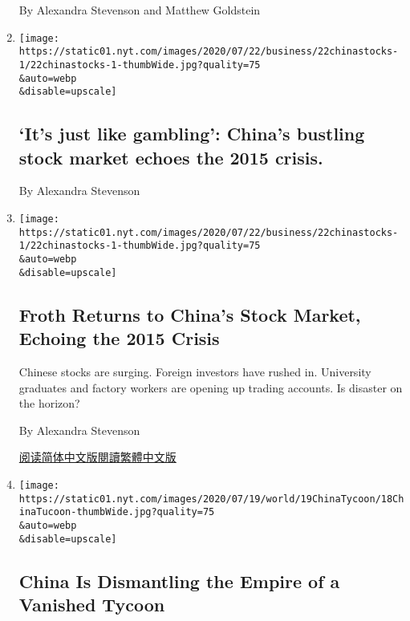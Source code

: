 \begin{enumerate}
  By Alexandra Stevenson and Matthew Goldstein
\item
  \href{/2020/07/22/business/its-just-like-gambling-chinas-bustling-stock-market-echoes-the-2015-crisis.html}{}

  \texttt{[image: https://static01.nyt.com/images/2020/07/22/business/22chinastocks-1/22chinastocks-1-thumbWide.jpg?quality=75\\\&auto=webp\\\&disable=upscale]}

  \hypertarget{its-just-like-gambling-chinas-bustling-stock-market-echoes-the-2015-crisis}{%
  \subsection{`It's just like gambling': China's bustling stock market
  echoes the 2015
  crisis.}\label{its-just-like-gambling-chinas-bustling-stock-market-echoes-the-2015-crisis}}

  By Alexandra Stevenson
\item
  \href{/2020/07/22/business/china-stock-market.html}{}

  \texttt{[image: https://static01.nyt.com/images/2020/07/22/business/22chinastocks-1/22chinastocks-1-thumbWide.jpg?quality=75\\\&auto=webp\\\&disable=upscale]}

  \hypertarget{froth-returns-to-chinas-stock-market-echoing-the-2015-crisis}{%
  \subsection{Froth Returns to China's Stock Market, Echoing the 2015
  Crisis}\label{froth-returns-to-chinas-stock-market-echoing-the-2015-crisis}}

  Chinese stocks are surging. Foreign investors have rushed in.
  University graduates and factory workers are opening up trading
  accounts. Is disaster on the horizon?

  By Alexandra Stevenson

  \href{https://cn.nytimes.com/business/20200724/china-stock-market/}{阅读简体中文版}\href{https://cn.nytimes.com/business/20200724/china-stock-market/zh-hant/}{閱讀繁體中文版}
\item
  \href{/2020/07/18/business/china-xiao-jianhua.html}{}

  \texttt{[image: https://static01.nyt.com/images/2020/07/19/world/19ChinaTycoon/18ChinaTucoon-thumbWide.jpg?quality=75\\\&auto=webp\\\&disable=upscale]}

  \hypertarget{china-is-dismantling-the-empire-of-a-vanished-tycoon}{%
  \subsection{China Is Dismantling the Empire of a Vanished
  Tycoon}\label{china-is-dismantling-the-empire-of-a-vanished-tycoon}}


\end{enumerate}
